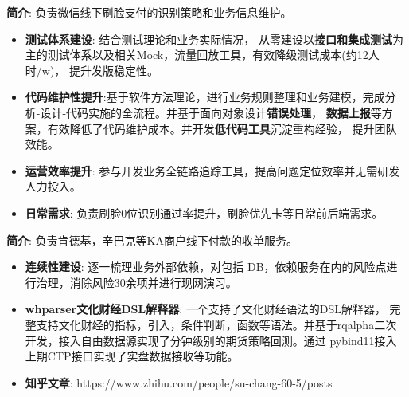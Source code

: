 \documentclass{resume}
\begin{document}
\begin{onehalfspacing}
\textbf{简介}: 负责微信线下刷脸支付的识别策略和业务信息维护。
 \begin{itemize}[parsep=0.5ex]
   \item \textbf{测试体系建设}: 结合测试理论和业务实际情况， 从零建设以\textbf{接口和集成测试}为主的测试体系以及相关Mock，流量回放工具，有效降级测试成本(约12人时/w)， 提升发版稳定性。
   \item \textbf{代码维护性提升}:基于软件方法理论，进行业务规则整理和业务建模，完成分析-设计-代码实施的全流程。并基于面向对象设计\textbf{错误处理}， \textbf{数据上报}等方案，有效降低了代码维护成本。并开发\textbf{低代码工具}沉淀重构经验， 提升团队效能。
   \item \textbf{运营效率提升}: 参与开发业务全链路追踪工具，提高问题定位效率并无需研发人力投入。
   \item \textbf{日常需求}: 负责刷脸0位识别通过率提升，刷脸优先卡等日常前后端需求。
\end{itemize}
\end{onehalfspacing}



\begin{onehalfspacing}
\textbf{简介}: 负责肯德基，辛巴克等KA商户线下付款的收单服务。
 \begin{itemize}[parsep=0.5ex]
   \item \textbf{连续性建设}: 逐一梳理业务外部依赖，对包括 DB，依赖服务在内的风险点进行治理，消除风险30余项并进行现网演习。
\end{itemize}
\end{onehalfspacing}



\begin{onehalfspacing}
\begin{itemize}[parsep=0.5ex]
    \item \textbf{whparser文化财经DSL解释器}: 一个支持了文化财经语法的DSL解释器， 完整支持文化财经的指标，引入，条件判断，函数等语法。并基于rqalpha二次开发，接入自由数据源实现了分钟级别的期货策略回测。通过 pybind11接入上期CTP接口实现了实盘数据接收等功能。
    \item \textbf{知乎文章}:  https://www.zhihu.com/people/su-chang-60-5/posts
\end{itemize}
\end{onehalfspacing}
\end{document}
